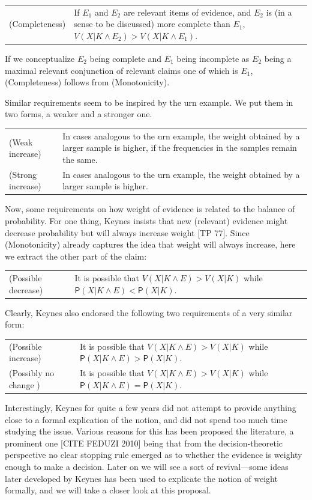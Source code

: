 \documentclass[
  10pt,
  dvipsnames,enabledeprecatedfontcommands]{scrartcl}
\newcommand{\pr}[1]{\mathsf{P}(#1)}
\begin{document}
\begin{tabular}{lp{11cm}}
(Completeness) & If $E_1$ and $E_2$ are relevant items of evidence, and $E_2$ is (in a sense to be discussed) more complete than $E_1$,  $V(X\vert K \wedge E_2) > V(X\vert K \wedge E_1)$.
\end{tabular}

\noindent If we conceptualize \(E_2\) being complete and \(E_1\) being
incomplete as \(E_2\) being a maximal relevant conjunction of relevant
claims one of which is \(E_1\), (Completeness) follows from
(Monotonicity).

Similar requirements seem to be inspired by the urn example. We put them
in two forms, a weaker and a stronger one.

\begin{tabular}{lp{11cm}}
(Weak increase) & In cases analogous to the urn example, the weight obtained by a larger sample is higher, if the frequencies in the samples remain the same.\\
(Strong increase) & In cases analogous to the urn example, the weight obtained by a larger sample is higher.
\end{tabular}

Now, some requirements on how weight of evidence is related to the
balance of probability. For one thing, Keynes insists that new
(relevant) evidence might decrease probability but will always increase
weight {[}TP 77{]}. Since (Monotonicity) already captures the idea that
weight will always increase, here we extract the other part of the
claim:

\begin{tabular}{lp{11cm}}
(Possible decrease) & It is possible that   $V(X\vert K \wedge E) > V(X\vert K)$ while $\pr{X \vert K \wedge E} <  \pr {X\vert K}$.
\end{tabular}

Clearly, Keynes also endorsed the following two requirements of a very
similar form:

\begin{tabular}{lp{11cm}}
(Possible increase) & It is possible that   $V(X\vert K \wedge E) > V(X\vert K)$ while $\pr{X \vert K \wedge E} >  \pr {X\vert K}$. \\
(Possibly no change ) & It is possible that   $V(X\vert K \wedge E) > V(X\vert K)$ while $\pr{X \vert K \wedge E} =  \pr {X\vert K}$.
\end{tabular}

Interestingly, Keynes for quite a few years did not attempt to provide
anything close to a formal explication of the notion, and did not spend
too much time studying the issue. Various reasons for this has been
proposed the literature, a prominent one {[}CITE FEDUZI 2010{]} being
that from the decision-theoretic perspective no clear stopping rule
emerged as to whether the evidence is weighty enough to make a decision.
Later on we will see a sort of revival---some ideas later developed by
Keynes has been used to explicate the notion of weight formally, and we
will take a closer look at this proposal. 
\end{document}
